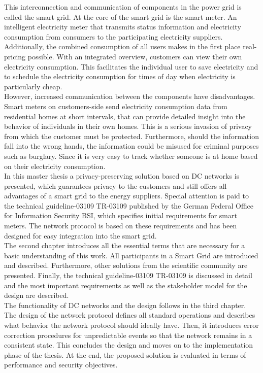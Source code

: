This interconnection and communication of components in the power grid is called the smart grid. At the core of the smart grid is the smart meter. An intelligent electricity meter that transmits status information and electricity consumption from consumers to the participating electricity suppliers. Additionally, the combined consumption of all users makes in the first place real-pricing possible. With an integrated overview, customers can view their own electricity consumption. This facilitates the individual user to save electricity and to schedule the electricity consumption for times of day when electricity is particularly cheap.\\ However, increased communication between the components have disadvantages. Smart meters on customers-side send electricity consumption data from residential homes at short intervals, that can provide detailed insight into the behavior of individuals in their own homes. This is a serious invasion of privacy from which the customer must be protected. Furthermore, should the information fall into the wrong hands, the information could be misused for criminal purposes such as burglary. Since it is very easy to track whether someone is at home based on their electricity consumption.\\ In this master thesis a privacy-preserving solution based on DC networks is presented, which guarantees privacy to the customers and still offers all advantages of a smart grid to the energy suppliers. Special attention is paid to the technical guideline-03109 \gls{TR-03109} published by the German Federal Office for Information Security \gls{BSI}, which specifies initial requirements for smart meters. The network protocol is based on these requirements and has been designed for easy integration into the smart grid.\\ The second chapter introduces all the essential terms that are necessary for a basic understanding of this work. All participants in a Smart Grid are introduced and described. Furthermore, other solutions from the scientific community are presented. Finally, the technical guideline-03109 \gls{TR-03109} is discussed in detail and the most important requirements as well as the stakeholder model for the design are described.\\ The functionality of DC networks and the design follows in the third chapter. The design of the network protocol defines all standard operations and describes what behavior the network protocol should ideally have. Then, it introduces error correction procedures for unpredictable events so that the network remains in a consistent state. This concludes the design and moves on to the implementation phase of the thesis. At the end, the proposed solution is evaluated in terms of performance and security objectives.\\
